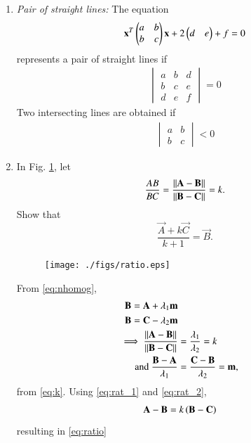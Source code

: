 \begin{enumerate}[label=\arabic*.,ref=\thesubsection.\theenumi]
\item {\em Pair of straight lines:} The equation
\begin{align}
\mathbf{x}^T\begin{pmatrix}a & b\\ b & c\end{pmatrix}\mathbf{x}+2\begin{pmatrix}d & e\end{pmatrix}+f=0
\end{align}
%
represents a pair of straight lines if 
\begin{align}
\begin{vmatrix}
a & b & d
\\
b & c & e
\\
d & e & f
\end{vmatrix}
= 0
\end{align}
%
Two intersecting lines are obtained if 
\begin{align}
\begin{vmatrix}
a & b 
\\
b & c 
\end{vmatrix}
< 0
\end{align}
\item  In Fig. \ref{fig:ratio}, let
\begin{equation}
\frac{AB}{BC} = \frac{\lVert\mathbf{A}-\mathbf{B}\rVert}{\lVert\mathbf{B}-\mathbf{C}\rVert} = k.
\label{eq:k}
\end{equation}
%
Show that
\begin{equation}
\frac{\vec{A}+k\vec{C}}{k+1} = \vec{B}.
\label{eq:ratio}
\end{equation}
%
\solution
%
\begin{figure}[!hb]
\centering
\texttt{[image: ./figs/ratio.eps]}
\caption{}
\label{fig:ratio}
\end{figure}
From \eqref{eq:nhomog}, 
\begin{align}
\begin{split}
\mathbf{B} &= \mathbf{A} + \lambda_1 \mathbf{m}
\\
\mathbf{B} &= \mathbf{C} - \lambda_2 \mathbf{m}
\end{split}
\\
\label{eq:rat_1}
\implies \frac{\lVert\mathbf{A}-\mathbf{B}\rVert}{\lVert\mathbf{B}-\mathbf{C}\rVert} &= 
\frac{\lambda_1}{\lambda_2} = k
\\
\text{and } \frac{\mathbf{B}- \mathbf{A}}{\lambda_1} &= \frac{\mathbf{C}- 
\mathbf{B}}{\lambda_2} = \mathbf{m},
\label{eq:rat_2}
\end{align}
%
from \eqref{eq:k}. Using \eqref{eq:rat_1} and \eqref{eq:rat_2},
\begin{align}
\mathbf{A}- \mathbf{B} &=  k\left(\mathbf{B}- \mathbf{C}\right)
\end{align}
%
resulting in \eqref{eq:ratio}


\end{enumerate}

